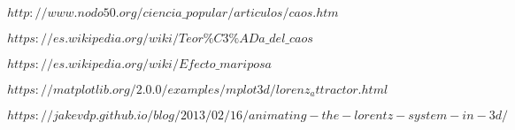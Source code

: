 \documentclass[12pt]{article}
\begin{document}
\begin{doublespace}
\begin{thebibliography}{9}
 \textsc{$http://www.nodo50.org/ciencia\_popular/articulos/caos.htm$}

 \textsc{$https://es.wikipedia.org/wiki/Teor\%C3\%ADa\_del\_caos$}

 \textsc{$https://es.wikipedia.org/wiki/Efecto\_mariposa$}

 \textsc{$https://matplotlib.org/2.0.0/examples/mplot3d/lorenz_attractor.html$}

 \textsc{$https://jakevdp.github.io/blog/2013/02/16/animating-the-lorentz-system-in-3d/$}
\end{thebibliography}


\end{doublespace}
\end{document}
